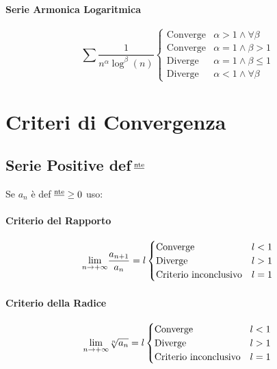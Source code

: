 \documentclass[12pt, a4paper, openany]{book}
\begin{document}
\paragraph*{Serie Armonica Logaritmica}
\begin{equation*}
	\sum \frac{1}{n^\alpha \log^\beta(n)}
	\begin{cases}
		\text{Converge} & \alpha > 1 \wedge \forall \beta \\
		\text{Converge} & \alpha = 1 \wedge \beta > 1     \\
		\text{Diverge}  & \alpha = 1 \wedge \beta \leq 1  \\
		\text{Diverge}  & \alpha < 1 \wedge \forall \beta
	\end{cases}
\end{equation*}


\section{Criteri di Convergenza}


\subsection*{Serie Positive def$^{\text{ \underline{nte}}}$}
Se $a_n$ è def$^{\text{ \underline{nte}}} \geq 0$ uso:
\paragraph*{Criterio del Rapporto} 
\[
	\underset{n \to +\infty}{\lim} \frac{a_{n+1}}{a_n} = l
	\begin{cases}
		\text{Converge} &  l<1\\
		\text{Diverge} & l>1\\
		\text{Criterio inconclusivo} & l=1
	\end{cases}
\]

\paragraph*{Criterio della Radice} 
\[
	\underset{n \to +\infty}{\lim} \sqrt[n]{a_n} = l
	\begin{cases}
		\text{Converge} &  l<1\\
		\text{Diverge} & l>1\\
		\text{Criterio inconclusivo} & l=1
	\end{cases}
\]
\end{document}
